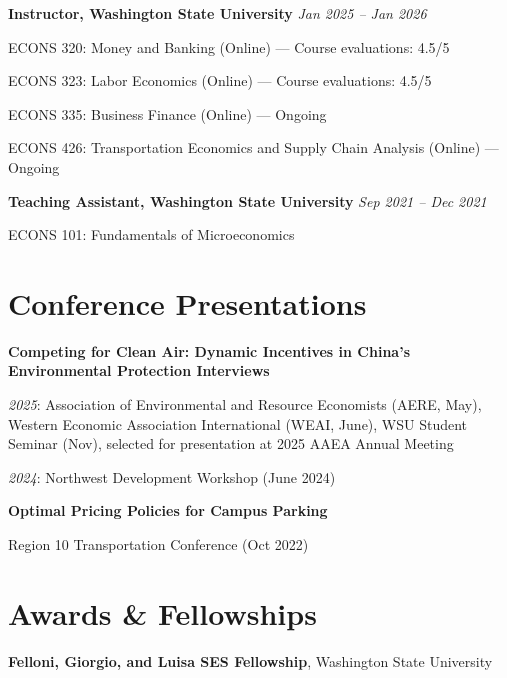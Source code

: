 \documentclass[11pt,letterpaper]{article}
\begin{document}
\textbf{Instructor, Washington State University} \hfill \textit{Jan 2025 -- Jan 2026}

\hspace{1.5em}ECONS 320: Money and Banking (Online) — Course evaluations: 4.5/5

\hspace{1.5em}ECONS 323: Labor Economics (Online) — Course evaluations: 4.5/5

\hspace{1.5em}ECONS 335: Business Finance (Online) — Ongoing

\hspace{1.5em}ECONS 426: Transportation Economics and Supply Chain Analysis (Online) — Ongoing

\textbf{Teaching Assistant, Washington State University} \hfill \textit{Sep 2021 -- Dec 2021}

\hspace{1.5em}ECONS 101: Fundamentals of Microeconomics

\section{Conference Presentations}

\textbf{Competing for Clean Air: Dynamic Incentives in China's Environmental Protection Interviews}

\begin{adjustwidth}{1.5em}{0pt}
\textit{2025}: Association of Environmental and Resource Economists (AERE, May), Western Economic Association International (WEAI, June), WSU Student Seminar (Nov), selected for presentation at 2025 AAEA Annual Meeting

\textit{2024}: Northwest Development Workshop (June 2024)
\end{adjustwidth}

\textbf{Optimal Pricing Policies for Campus Parking}

\begin{adjustwidth}{1.5em}{0pt}
Region 10 Transportation Conference (Oct 2022)
\end{adjustwidth}


\section{Awards \& Fellowships}

\textbf{Felloni, Giorgio, and Luisa SES Fellowship}, Washington State University
\end{document}
